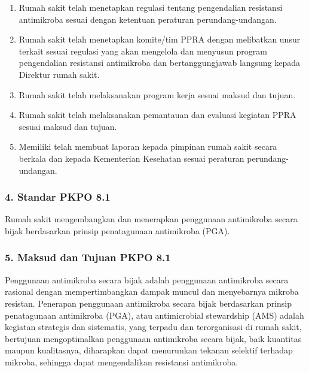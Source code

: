 \documentclass[
]{book}
\providecommand{\tightlist}{%
  \setlength{\itemsep}{0pt}\setlength{\parskip}{0pt}}
\begin{document}
\begin{enumerate}
\def\labelenumi{\alph{enumi}.}
\tightlist
\item
  Rumah sakit telah menetapkan regulasi tentang pengendalian resistansi antimikroba sesuai dengan ketentuan peraturan perundang-undangan.
\item
  Rumah sakit telah menetapkan komite/tim PPRA dengan melibatkan unsur terkait sesuai regulasi yang akan mengelola dan menyusun program pengendalian resistansi antimikroba dan bertanggungjawab langsung kepada Direktur rumah sakit.
\item
  Rumah sakit telah melaksanakan program kerja sesuai maksud dan tujuan.
\item
  Rumah sakit telah melaksanakan pemantauan dan evaluasi kegiatan PPRA sesuai maksud dan tujuan.
\item
  Memiliki telah membuat laporan kepada pimpinan rumah sakit secara berkala dan kepada Kementerian Kesehatan sesuai peraturan perundang-undangan.
\end{enumerate}

\hypertarget{standar-pkpo-8.1}{%
\subsubsection*{4. Standar PKPO 8.1}\label{standar-pkpo-8.1}}

Rumah sakit mengembangkan dan menerapkan penggunaan antimikroba secara bijak berdasarkan prinsip penatagunaan antimikroba (PGA).

\hypertarget{maksud-dan-tujuan-pkpo-8.1}{%
\subsubsection*{5. Maksud dan Tujuan PKPO 8.1}\label{maksud-dan-tujuan-pkpo-8.1}}

Penggunaan antimikroba secara bijak adalah penggunaan antimikroba secara rasional dengan mempertimbangkan dampak muncul dan menyebarnya mikroba resistan. Penerapan penggunaan antimikroba secara bijak berdasarkan prinsip penatagunaan antimikroba (PGA), atau antimicrobial stewardship (AMS) adalah kegiatan strategis dan sistematis, yang terpadu dan terorganisasi di rumah sakit, bertujuan mengoptimalkan penggunaan antimikroba secara bijak, baik kuantitas maupun kualitasnya, diharapkan dapat menurunkan tekanan selektif terhadap mikroba, sehingga dapat mengendalikan resistansi antimikroba.
\end{document}
